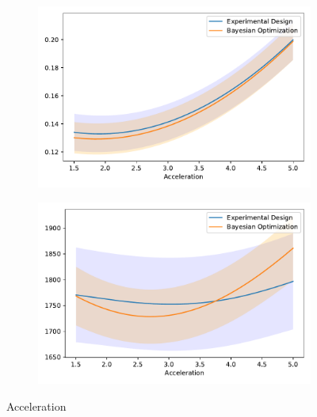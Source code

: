 \begin{figure}[h!]
\centering
\begin{subfigure}{0.5\textwidth}
  \centering
  \includegraphics[width=\textwidth]{images/ofat_compare/time/acceleration.pdf}
\end{subfigure}%
\begin{subfigure}{0.5\textwidth}
  \centering
  \includegraphics[width=\textwidth]{images/ofat_compare/co2/acceleration.pdf}
\end{subfigure}
\caption{Acceleration}
\end{figure}
